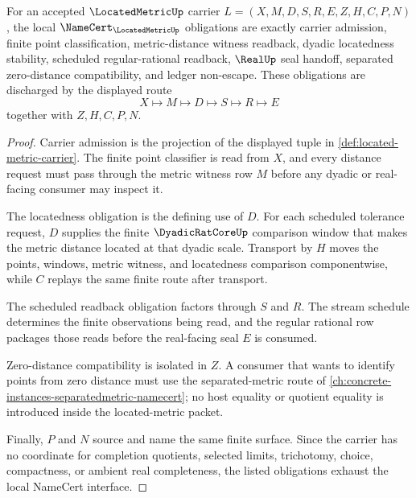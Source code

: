 \begin{theorem}
\label{thm:located-metric-namecert-obligations}
For an accepted $\LocatedMetricUp$ carrier $L=(X,M,D,S,R,E,Z,H,C,P,N)$, the local $\NameCert_{\LocatedMetricUp}$ obligations are exactly carrier admission, finite point classification, metric-distance witness readback, dyadic locatedness stability, scheduled regular-rational readback, $\RealUp$ seal handoff, separated zero-distance compatibility, and ledger non-escape. These obligations are discharged by the displayed route
$$
X\longmapsto M\longmapsto D\longmapsto S\longmapsto R\longmapsto E
$$
together with $Z,H,C,P,N$.
\end{theorem}
\begin{proof}
Carrier admission is the projection of the displayed tuple in \autoref{def:located-metric-carrier}. The finite point classifier is read from $X$, and every distance request must pass through the metric witness row $M$ before any dyadic or real-facing consumer may inspect it.

The locatedness obligation is the defining use of $D$. For each scheduled tolerance request, $D$ supplies the finite $\DyadicRatCoreUp$ comparison window that makes the metric distance located at that dyadic scale. Transport by $H$ moves the points, windows, metric witness, and locatedness comparison componentwise, while $C$ replays the same finite route after transport.

The scheduled readback obligation factors through $S$ and $R$. The stream schedule determines the finite observations being read, and the regular rational row packages those reads before the real-facing seal $E$ is consumed.

Zero-distance compatibility is isolated in $Z$. A consumer that wants to identify points from zero distance must use the separated-metric route of \autoref{ch:concrete-instances-separatedmetric-namecert}; no host equality or quotient equality is introduced inside the located-metric packet.

Finally, $P$ and $N$ source and name the same finite surface. Since the carrier has no coordinate for completion quotients, selected limits, trichotomy, choice, compactness, or ambient real completeness, the listed obligations exhaust the local NameCert interface.
\end{proof}

